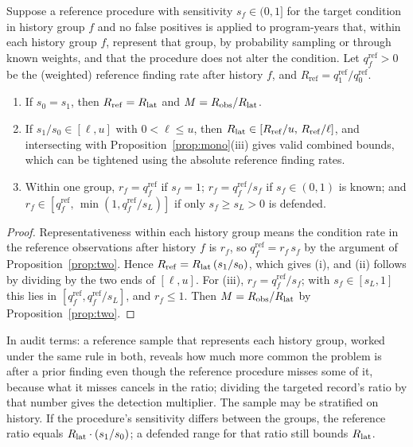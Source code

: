 \begin{proposition}\label{prop:ref}
Suppose a reference procedure with sensitivity $s_f \in (0,1]$ for the
target condition in history group $f$ and no false positives is applied to program-years that, within
each history group $f$, represent that group, by probability sampling or
through known weights, and that the procedure does not alter the condition.
Let $q^{\mathrm{ref}}_f > 0$ be the (weighted) reference finding rate after
history $f$, and $R_{\mathrm{ref}} =
q^{\mathrm{ref}}_1/q^{\mathrm{ref}}_0$.
\begin{enumerate}
\item[(i)] If $s_0 = s_1$, then $R_{\mathrm{ref}} = R_{\mathrm{lat}}$ and $M = R_{\mathrm{obs}}/R_{\mathrm{lat}}$.
\item[(ii)] If $s_1/s_0 \in [\ell, u]$ with $0 < \ell \le u$, then $R_{\mathrm{lat}} \in
[R_{\mathrm{ref}}/u,\, R_{\mathrm{ref}}/\ell]$, and intersecting with
Proposition~\ref{prop:mono}(iii) gives valid combined bounds, which can be
tightened using the absolute reference finding rates.
\item[(iii)] Within one group, $r_f = q^{\mathrm{ref}}_f$ if $s_f = 1$; $r_f =
q^{\mathrm{ref}}_f/s_f$ if $s_f \in (0,1)$ is known; and $r_f \in
[q^{\mathrm{ref}}_f,\, \min(1, q^{\mathrm{ref}}_f/s_L)]$ if only $s_f \ge s_L
> 0$ is defended.
\end{enumerate}
\end{proposition}

\begin{proof}
Representativeness within each history group means the condition rate in the
reference observations after history $f$ is $r_f$, so $q^{\mathrm{ref}}_f =
r_f\, s_f$ by the argument of Proposition~\ref{prop:two}. Hence
$R_{\mathrm{ref}} = R_{\mathrm{lat}}\,(s_1/s_0)$, which gives (i), and (ii) follows by
dividing by the two ends of $[\ell, u]$. For (iii), $r_f =
q^{\mathrm{ref}}_f/s_f$; with $s_f \in [s_L, 1]$ this lies in
$[q^{\mathrm{ref}}_f, q^{\mathrm{ref}}_f/s_L]$, and $r_f \le 1$. Then $M =
R_{\mathrm{obs}}/R_{\mathrm{lat}}$ by Proposition~\ref{prop:two}.
\end{proof}

In audit terms: a reference sample that represents each history group, worked
under the same rule in both, reveals how much more common the problem is
after a prior finding even though the reference procedure misses some of it,
because what it misses cancels in the ratio; dividing the targeted record's
ratio by that number gives the detection multiplier. The sample may be
stratified on history. If the procedure's sensitivity differs between the
groups, the reference ratio equals $R_{\mathrm{lat}} \cdot (s_1/s_0)$; a defended range
for that ratio still bounds $R_{\mathrm{lat}}$.

